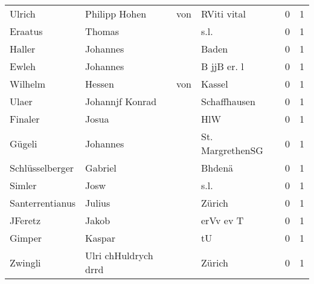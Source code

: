 \documentclass[10pt,a4paper,landscape]{article}
\begin{document}
\begin{longtable}{llllrr}
                   Ulrich &                     Philipp  Hohen &         von &                                 RViti vital &          0 &         1 \\
                  Eraatus &                             Thomas &             &                                        s.l. &          0 &         1 \\
                   Haller &                           Johannes &             &                                       Baden &          0 &         1 \\
                    Ewleh &                           Johannes &             &                                 B jjB er. l &          0 &         1 \\
                  Wilhelm &                             Hessen &         von &                                      Kassel &          0 &         1 \\
                    Ulaer &                    Johannjf Konrad &             &                                Schaffhausen &          0 &         1 \\
                  Finaler &                              Josua &             &                                         HlW &          0 &         1 \\
                   Gügeli &                           Johannes &             &                            St. MargrethenSG &          0 &         1 \\
          Schlüsselberger &                            Gabriel &             &                                      Bhdenä &          0 &         1 \\
                   Simler &                               Josw &             &                                        s.l. &          0 &         1 \\
          Santerrentianus &                             Julius &             &                                      Zürich &          0 &         1 \\
                  JFeretz &                              Jakob &             &                                   erVv ev T &          0 &         1 \\
                   Gimper &                             Kaspar &             &                                          tU &          0 &         1 \\
                  Zwingli &               Ulri chHuldrych drrd &             &                                      Zürich &          0 &         1 \\

\end{longtable}
\end{document}
